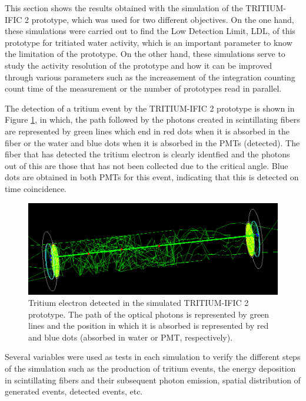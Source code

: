 This section shows the results obtained with the simulation of the TRITIUM-IFIC 2 prototype, which was used for two different objectives. On the one hand, these simulations were carried out to find the Low Detection Limit, LDL, of this prototype for tritiated water activity, which is an important parameter to know the limitation of the prototype. On the other hand, these simulations serve to study the activity resolution of the prototype and  how it can be improved through various parameters such as the increasement of the integration counting count time of the measurement or the number of prototypes read in parallel.

The detection of a tritium event by the TRITIUM-IFIC 2 prototype is shown in Figure \ref{fig:TritiumEventDetectedInSimulatedPrototype}, in which, the path followed by the photons created in scintillating fibers are represented by green lines which end in red dots when it is absorbed in the fiber or the water and blue dots when it is absorbed in the PMTs (detected). The fiber that has detected the tritium electron is clearly identfied and the photons out of this are those that has not been collected due to the critical angle. Blue dots are obtained in both PMTs for this event, indicating that this is detected on time coincidence.

\begin{figure}[hbtp]
\centering
\includegraphics[scale=0.35]{Figures/8SimulationsResults/82TRITIUMMonitor/821TRITIUMIFIC2/EventDetectedInTRITIUMIFIC2.png}
\caption{Tritium electron detected in the simulated TRITIUM-IFIC 2 prototype. The path of the optical photons is represented by green lines and the position in which it is absorbed is represented by red and blue dots (absorbed in water or PMT, respectively).\label{fig:TritiumEventDetectedInSimulatedPrototype}}
\end{figure}

Several variables were used as tests in each simulation to verify the different steps of the simulation such as the production of tritium events, the energy deposition in scintillating fibers and their subsequent photon emission, spatial distribution of generated events, detected events, etc. %

